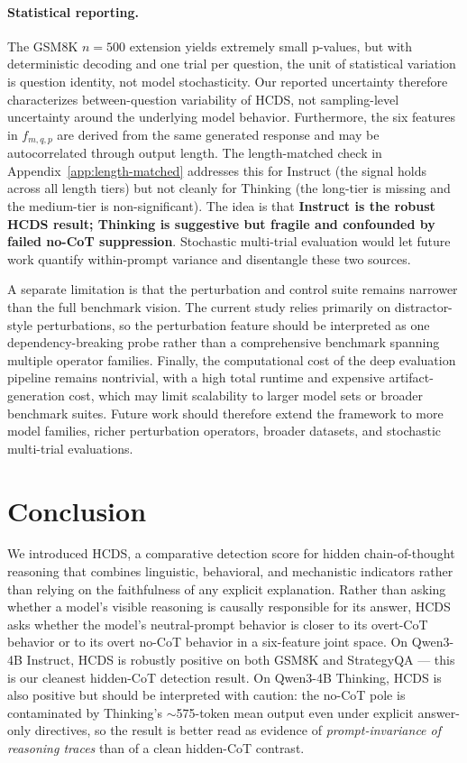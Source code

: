 \documentclass{article}
\theoremstyle{plain}
\theoremstyle{definition}
\theoremstyle{remark}
\begin{document}
\paragraph{Statistical reporting.}
The GSM8K $n=500$ extension yields extremely small p-values, but with deterministic decoding and one trial per question, the unit of statistical variation is question identity, not model stochasticity. Our reported uncertainty therefore characterizes between-question variability of HCDS, not sampling-level uncertainty around the underlying model behavior. Furthermore, the six features in $f_{m,q,p}$ are derived from the same generated response and may be autocorrelated through output length. The length-matched check in Appendix~\ref{app:length-matched} addresses this for Instruct (the signal holds across all length tiers) but not cleanly for Thinking (the long-tier is missing and the medium-tier is non-significant). The idea is that \textbf{Instruct is the robust HCDS result; Thinking is suggestive but fragile and confounded by failed no-CoT suppression}. Stochastic multi-trial evaluation would let future work quantify within-prompt variance and disentangle these two sources.

A separate limitation is that the perturbation and control suite remains narrower than the full benchmark vision. The current study relies primarily on distractor-style perturbations, so the perturbation feature should be interpreted as one dependency-breaking probe rather than a comprehensive benchmark spanning multiple operator families. Finally, the computational cost of the deep evaluation pipeline remains nontrivial, with a high total runtime and expensive artifact-generation cost, which may limit scalability to larger model sets or broader benchmark suites. Future work should therefore extend the framework to more model families, richer perturbation operators, broader datasets, and stochastic multi-trial evaluations.

\section{Conclusion}

We introduced HCDS, a comparative detection score for hidden chain-of-thought reasoning that combines linguistic, behavioral, and mechanistic indicators rather than relying on the faithfulness of any explicit explanation. Rather than asking whether a model's visible reasoning is causally responsible for its answer, HCDS asks whether the model's neutral-prompt behavior is closer to its overt-CoT behavior or to its overt no-CoT behavior in a six-feature joint space. On Qwen3-4B Instruct, HCDS is robustly positive on both GSM8K and StrategyQA --- this is our cleanest hidden-CoT detection result. On Qwen3-4B Thinking, HCDS is also positive but should be interpreted with caution: the no-CoT pole is contaminated by Thinking's $\sim$575-token mean output even under explicit answer-only directives, so the result is better read as evidence of \emph{prompt-invariance of reasoning traces} than of a clean hidden-CoT contrast.
\end{document}
